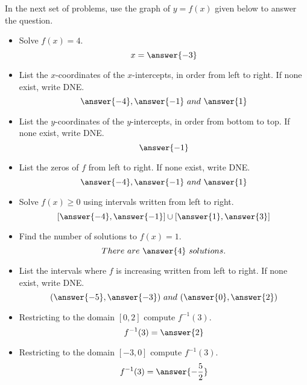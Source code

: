 \documentclass{ximera}
\author{Carl Stitz \and Jeff Zeager \and Bart Snapp \and Matthew Carr\and Nela Lakos}
\begin{document}
\begin{exercise}
In the next set of problems, use the graph of $y = f(x)$ given below
to answer the question.
\begin{image}
\end{image}
\begin{itemize}
\item Solve $f(x) = 4$. \[x=\answer{-3}\]
\item List the $x$-coordinates of the $x$-intercepts, in order from left to right. If none exist, write
  DNE. \[\answer{-4}, \answer{-1}\ and\ \answer{1}\]
\item List the $y$-coordinates of the $y$-intercepts, in order from bottom to top. If none exist, write
  DNE. \[\answer{-1}\]
\item List the zeros of $f$ from left to right. If none exist, write
  DNE. \[\answer{-4}, \answer{-1}\ and\ \answer{1}\]
\item Solve $f(x) \geq 0$ using intervals written from left to right. \[[\answer{-4},\answer{-1}]\cup[\answer{1},\answer{3}]\]
\item Find the number of solutions to $f(x) = 1$. \[There\ are\ \answer{4}\ solutions.\]
\item List the intervals where $f$ is increasing written from left to right. If none exist, write DNE. \[(\answer{-5},\answer{-3})\ and\ (\answer{0},\answer{2})\]
\item Restricting to the domain $[0,2]$ compute $f^{-1}(3)$. \[f^{-1}(3)=\answer{2}\]
\item Restricting to the domain $[-3,0]$ compute $f^{-1}(3)$. \[f^{-1}(3)=\answer{-\frac{5}{2}}\]
\end{itemize}
\end{exercise}
\end{document}
